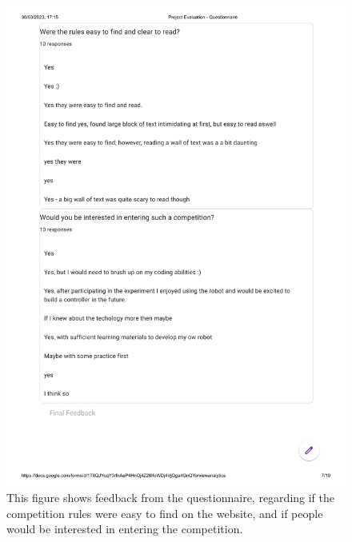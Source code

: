 \documentclass{l4proj}
\begin{document}
\begin{appendices}
\begin{figure}
    \centering
    \includegraphics[width=1\textwidth]{images/website-question-2.pdf}
    \caption{This figure shows feedback from the questionnaire, regarding if the competition rules were easy to find on the website, and if people would be interested in entering the competition.}
    \label{fig:feedback-2}
\end{figure}

\end{appendices}





\end{document}
